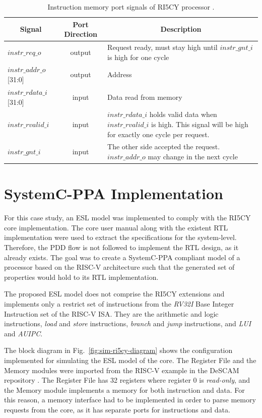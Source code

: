 \begin{table}[htb!] 
	\centering 
	\caption{Instruction memory port signals of RI5CY processor \cite{manual-ri5cy}.} 
	\label{tab:imem-signals}
	\begin{tabular}{l|c|p{7cm}} 
		\multicolumn{1}{c}{\bfseries Signal} & \multicolumn{1}{c}{\bfseries Port Direction} & \multicolumn{1}{c}{\bfseries Description} \\     
		\hline	
		$instr\_req\_o$  &  output & Request ready, must stay high until $instr\_gnt\_i$ is high for one cycle \\
		\hline
		$instr\_addr\_o$[31:0]  &  output & Address \\
		\hline
		$instr\_rdata\_i$[31:0]  &  input & Data read from memory \\
		\hline
		$instr\_rvalid\_i$  &  input & $instr\_rdata\_i$ holds valid data when $instr\_rvalid\_i$ is high. This signal will be high for exactly one cycle per request. \\
		\hline
		$instr\_gnt\_i$  &  input & The other side accepted the request. $instr\_addr\_o$ may change in the next cycle \\
		\hline
	\end{tabular} 
\end{table}

\section{SystemC-PPA Implementation}
\label{section:ri5cy-systemc-ppa}

For this case study, an ESL model was implemented to comply with the RI5CY core implementation. The core user manual along with the existent RTL implementation were used to extract the specifications for the system-level. Therefore, the PDD flow is not followed to implement the RTL design, as it already exists. The goal was to create a SystemC-PPA compliant model of a processor based on the RISC-V architecture such that the generated set of properties would hold to its RTL implementation.

The proposed ESL model does not comprise the RI5CY extensions and implements only a restrict set of instructions from the \textit{RV32I} Base Integer Instruction set of the RISC-V ISA. They are the arithmetic and logic instructions, \textit{load} and \textit{store} instructions, \textit{branch} and \textit{jump} instructions, and \textit{LUI} and \textit{AUIPC}.

The block diagram in Fig.~\ref{fig:sim-ri5cy-diagram} shows the configuration implemented for simulating the ESL model of the core. The Register File and the Memory modules were imported from the RISC-V example in the DeSCAM repository \cite{descam}. The Register File has 32 registers where register 0 is \textit{read-only}, and the Memory module implements a memory for both instruction and data. For this reason, a memory interface had to be implemented in order to parse memory requests from the core, as it has separate ports for instructions and data.

